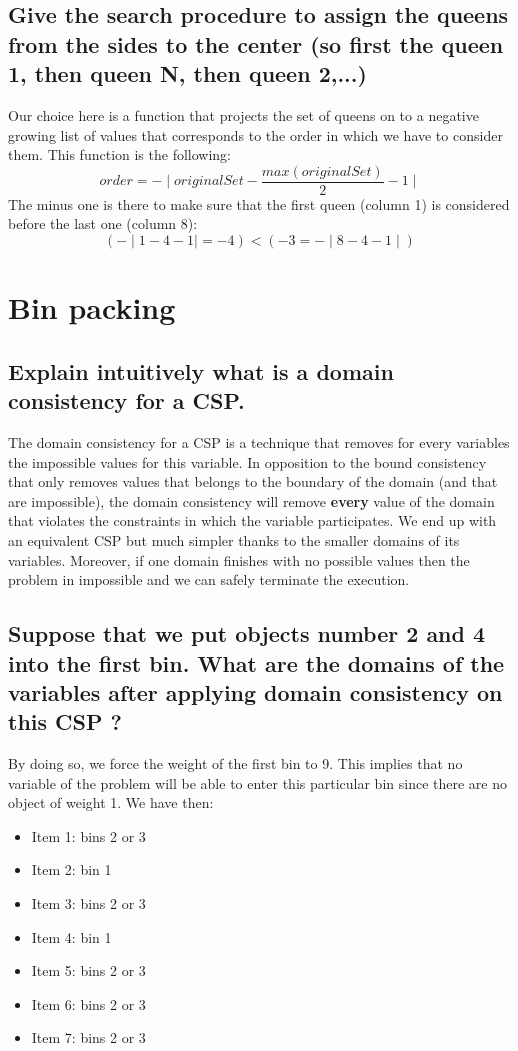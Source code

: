 \documentclass[a4paper ,12pt,french]{article}
\begin{document}
\subsection{Give the search procedure to assign the queens from the sides to the center (so first
the queen 1, then queen N, then queen 2,...)}
Our choice here is a function that projects the set of queens on to a negative growing list of values that corresponds to the order in which we have to consider them. This function is the following:
\begin{equation}
order = - \mid originalSet - \frac{max(originalSet)}{2} - 1 \mid
\end{equation}
The minus one is there to make sure that the first queen (column 1) is considered before the last one (column 8):
\begin{equation}
(-\mid 1-4-1\mid = -4) < (-3 = - \mid 8-4-1 \mid)
\end{equation}

\section{Bin packing}
\subsection{Explain intuitively what is a domain consistency for a CSP.}
The domain consistency for a CSP is a technique that removes for every variables the impossible values for this variable. In opposition to the bound consistency that only removes values that belongs to the boundary of the domain (and that are impossible), the domain consistency will remove \textbf{every} value of the domain that violates the constraints in which the variable participates. We end up with an equivalent CSP but much simpler thanks to the smaller domains of its variables. Moreover, if one domain finishes with no possible values then the problem in impossible and we can safely terminate the execution.  
\subsection{Suppose that we put objects number 2 and 4 into the first bin. What are the domains of the variables after applying domain consistency on this CSP ?}
By doing so, we force the weight of the first bin to 9. This implies that no variable of the problem will be able to enter this particular bin since there are no object of weight 1. We have then: \begin{itemize}
\item Item 1: bins 2 or 3
\item Item 2: bin 1
\item Item 3: bins 2 or 3
\item Item 4: bin 1
\item Item 5: bins 2 or 3
\item Item 6: bins 2 or 3
\item Item 7: bins 2 or 3

\end{itemize}
\end{document}

